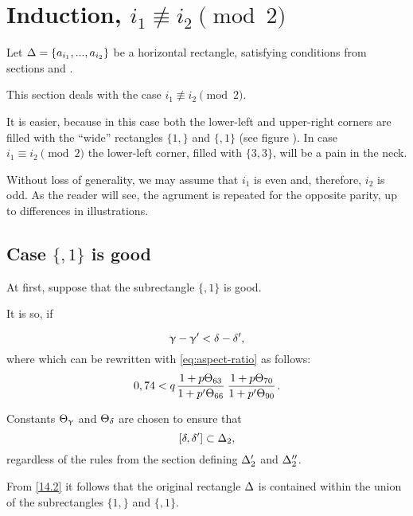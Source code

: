 \section{Induction, $i_1 \not\equiv i_2 \pmod 2$}

Let $\Delta = \{ a_{i_1}, ..., a_{i_2}\}$ be a horizontal rectangle,
satisfying conditions from sections  and .

This section deals with the case $i_1 \not\equiv i_2 \pmod 2$.

It is easier, because in this case both the lower-left and upper-right corners
are filled with the ``wide'' rectangles $\{1,\}$ and $\{,1\}$ (see figure ).
In case $i_1 \equiv i_2 \pmod 2$ the lower-left corner, filled with $\{3,3\}$,
will be a pain in the neck.

Without loss of generality, we may assume that $i_1$ is even and, therefore, $i_2$ is odd.
As the reader will see, the agrument is repeated for the opposite parity,
up to differences in illustrations.

\subsection{Case $\{, 1\}$ is good}

At first, suppose that the subrectangle $\{,1\}$ is good.

It is so, if


\begin{equation}\label{14.1}
	\upgamma - \upgamma' < \delta - \delta',
\end{equation}
where
which can be rewritten with \ref{eq:aspect-ratio} as follows:
\begin{equation}\label{14.2}
	0,74 < q \up{63}{66} \up{70}{90}.
\end{equation}

Constants $\Theta_{\upgamma}$ and $\Theta_{\delta}$ are chosen to ensure that
\begin{equation*}
	\left[ \delta, \delta' \right] \subset \Delta_2,
\end{equation*}
regardless of the rules from the section  defining $\Delta_2'$ and $\Delta_2''$.

From \ref{14.2} it follows that the original rectangle $\Delta$ is contained
within the union of the subrectangles $\{1,\}$ and $\{,1\}$.


